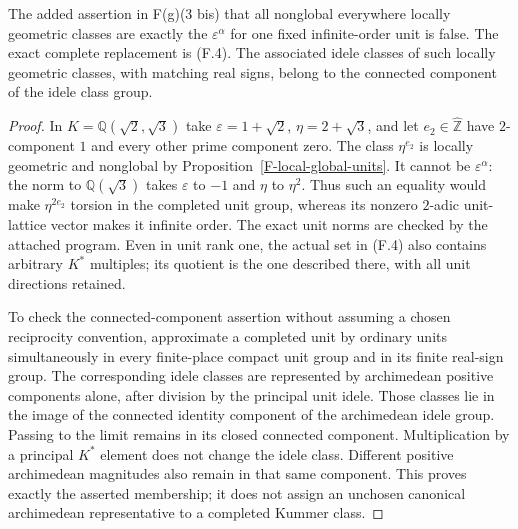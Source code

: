 \begin{proposition}
\label{F-one-unit-false}
The added assertion in F(g)(3 bis) that all nonglobal everywhere
locally geometric classes are exactly the $\varepsilon^\alpha$
for one fixed infinite-order unit is false. The exact complete
replacement is (F.4). The associated idele classes of such locally
geometric classes, with matching real signs, belong to the
connected component of the idele class group.
\end{proposition}
\begin{proof}
In $K=\mathbb Q(\sqrt2,\sqrt3)$ take
$\varepsilon=1+\sqrt2$, $\eta=2+\sqrt3$, and let
$e_2\in\widehat{\mathbb Z}$ have $2$-component $1$ and every
other prime component zero. The class $\eta^{e_2}$ is locally
geometric and nonglobal by Proposition~\ref{F-local-global-units}.
It cannot be $\varepsilon^\alpha$: the norm to
$\mathbb Q(\sqrt3)$ takes $\varepsilon$ to $-1$ and $\eta$
to $\eta^2$. Thus such an equality would make
$\eta^{2e_2}$ torsion in the completed unit group, whereas its
nonzero $2$-adic unit-lattice vector makes it infinite order.
The exact unit norms are checked by the attached program.
Even in unit rank one, the actual set in (F.4) also contains
arbitrary $K^*$ multiples; its quotient is the one described
there, with all unit directions retained.

To check the connected-component assertion without assuming a
chosen reciprocity convention, approximate a completed unit by
ordinary units simultaneously in every finite-place compact unit
group and in its finite real-sign group. The corresponding idele
classes are represented by archimedean positive components alone,
after division by the principal unit idele. Those classes lie in
the image of the connected identity component of the archimedean
idele group. Passing to the limit remains in its closed connected
component. Multiplication by a principal $K^*$ element does not
change the idele class. Different positive archimedean magnitudes
also remain in that same component. This proves exactly the
asserted membership; it does not assign an unchosen canonical
archimedean representative to a completed Kummer class.
\end{proof}


